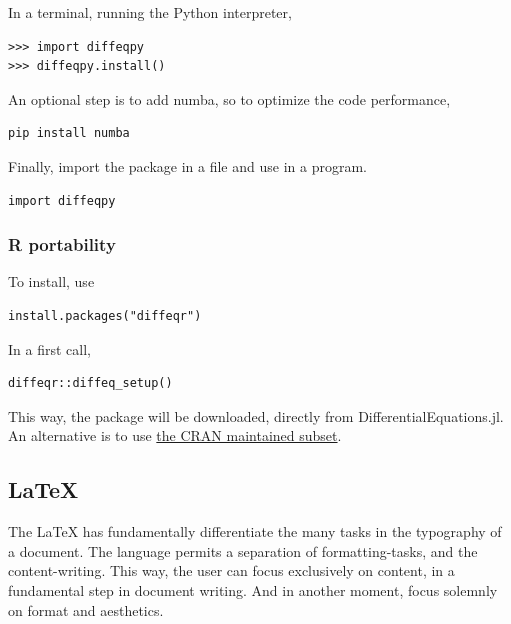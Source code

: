 \documentclass[
12pt,				%
openright,			%
oneside,			%
a4paper,			%
brazil,				%
english,			  %
]{abntex2}
\begin{document}
In a terminal, running the Python interpreter,
\begin{verbatim}
>>> import diffeqpy
>>> diffeqpy.install()
\end{verbatim}

An optional step is to add numba, so to optimize the code performance,
\begin{verbatim}
pip install numba
\end{verbatim}

Finally, import the package in a file and use in a program.
\begin{verbatim}
import diffeqpy
\end{verbatim}

\subsubsection{R portability}

To install, use
\begin{verbatim}
install.packages("diffeqr")
\end{verbatim}

In a first call,
\begin{verbatim}
diffeqr::diffeq_setup()
\end{verbatim}

This way, the package will be downloaded, directly from
DifferentialEquations.jl. An alternative is to use
\href{https://cran.r-project.org/web/packages/diffeqr/index.html}{the
  CRAN maintained subset}.

\subsection{\LaTeX}

The \LaTeX{} has fundamentally differentiate the many tasks in the
typography of a document. The language permits a separation of
formatting-tasks, and the content-writing. This way, the user can
focus exclusively on content, in a fundamental step in document
writing. And in another moment, focus solemnly on format and
aesthetics.
\end{document}
